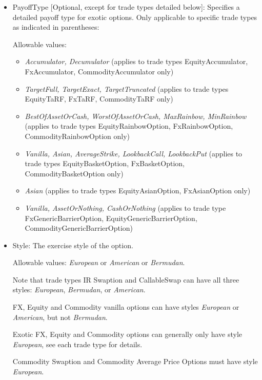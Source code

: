 \begin{itemize}
\begin{table}[H]
\begin{tabular} {|p{6cm}|p{8cm}|}
  \end{tabular}
  \caption{Specification of Option Type Call / Put}
  \label{tab:callput_specs}
\end{table}

\item PayoffType [Optional, except for trade types detailed below]: Specifies a detailed payoff type for exotic options. Only applicable to specific trade types as
  indicated in parentheses:

  Allowable values:
  \begin{itemize}
  \item \emph{Accumulator, Decumulator} (applies to trade types EquityAccumulator, FxAccumulator, CommodityAccumulator only)
  \item \emph{TargetFull, TargetExact, TargetTruncated} (applies to trade types EquityTaRF, FxTaRF, CommodityTaRF only)
  \item \emph{BestOfAssetOrCash, WorstOfAssetOrCash, MaxRainbow, MinRainbow} (applies to trade types EquityRainbowOption,
    FxRainbowOption, CommodityRainbowOption only)
  \item \emph{Vanilla, Asian, AverageStrike, LookbackCall, LookbackPut} (applies to trade types EquityBasketOption,
    FxBasketOption, CommodityBasketOption only)
  \item \emph{Asian} (applies to trade types EquityAsianOption, FxAsianOption only)
  \item \emph{Vanilla, AssetOrNothing, CashOrNothing} (applies to trade type FxGenericBarrierOption, EquityGenericBarrierOption, CommodityGenericBarrierOption)
  \end{itemize}

\item Style: The exercise style of the option.

  Allowable values: \emph{European} or \emph{American} or \emph{Bermudan}.

  Note that trade types IR Swaption and CallableSwap can have all three styles:
  \emph{European}, \emph{Bermudan}, or \emph{American}.

  FX, Equity and Commodity vanilla options can have styles \emph{European}
  or \emph{American}, but not \emph{Bermudan}.

  Exotic FX, Equity and Commodity  options can generally only have style \emph{European}, see each trade type for details.

  Commodity Swaption and Commodity Average Price Options must have style \emph{European}.


\end{itemize}
